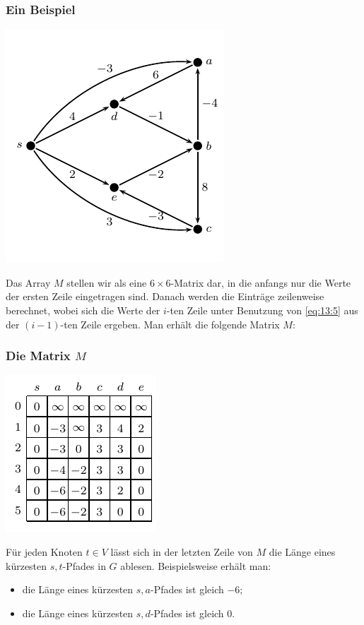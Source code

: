 \documentclass[smaller,xcolor=dvipsnames]{beamer}
\begin{document}
\begin{frame}
\frametitle{Ein Beispiel}
\begin{center}
 \includegraphics{fig99.pdf}
\end{center}

Das Array $M$ stellen wir als eine $6 \times 6$-Matrix dar, in die anfangs nur die Werte der ersten Zeile eingetragen sind. \alert{Danach werden die Einträge zeilenweise berechnet, wobei sich die Werte der $i$-ten Zeile unter Benutzung von \eqref{eq:13:5} aus der $(i-1)$-ten Zeile ergeben.} Man erhält die folgende Matrix $M$:
\end{frame}

\begin{frame}
\frametitle{Die Matrix $M$}
\begin{center}
\includegraphics[scale=1.2]{fig100.pdf}
\end{center}
\alert{Für jeden Knoten $t \in V$ lässt sich in der letzten Zeile von $M$ die Länge eines kürzesten $s,t$-Pfades in $G$ ablesen.} Beispielsweise erhält man:
\begin{itemize}
\item die Länge eines kürzesten $s,a$-Pfades ist gleich $-6$;
\item die Länge eines kürzesten $s,d$-Pfades ist gleich $0$.
\end{itemize}

\end{frame}
\end{document}
